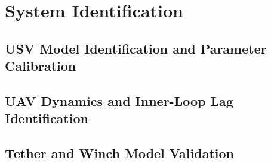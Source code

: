 
\section{System Identification}
\label{sec:system_identification}

\subsection{USV Model Identification and Parameter Calibration}
\label{subsec:usv_identification}

\subsection{UAV Dynamics and Inner-Loop Lag Identification}
\label{subsec:uav_identification}

\subsection{Tether and Winch Model Validation}
\label{subsec:tether_winch_identification}
